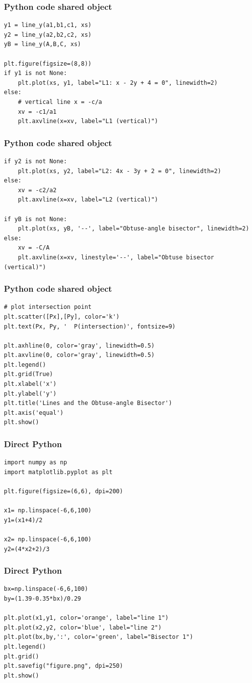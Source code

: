 \documentclass{beamer}
\begin{document}
\begin{frame}[fragile]
\frametitle{Python code shared object}
\begin{lstlisting}
y1 = line_y(a1,b1,c1, xs)
y2 = line_y(a2,b2,c2, xs)
yB = line_y(A,B,C, xs)

plt.figure(figsize=(8,8))
if y1 is not None:
    plt.plot(xs, y1, label="L1: x - 2y + 4 = 0", linewidth=2)
else:
    # vertical line x = -c/a
    xv = -c1/a1
    plt.axvline(x=xv, label="L1 (vertical)")
\end{lstlisting}
\end{frame}
\begin{frame}[fragile]
\frametitle{Python code shared object}
\begin{lstlisting}
if y2 is not None:
    plt.plot(xs, y2, label="L2: 4x - 3y + 2 = 0", linewidth=2)
else:
    xv = -c2/a2
    plt.axvline(x=xv, label="L2 (vertical)")

if yB is not None:
    plt.plot(xs, yB, '--', label="Obtuse-angle bisector", linewidth=2)
else:
    xv = -C/A
    plt.axvline(x=xv, linestyle='--', label="Obtuse bisector (vertical)")
\end{lstlisting}
\end{frame}
\begin{frame}[fragile]
\frametitle{Python code shared object}
\begin{lstlisting}
# plot intersection point
plt.scatter([Px],[Py], color='k')
plt.text(Px, Py, '  P(intersection)', fontsize=9)

plt.axhline(0, color='gray', linewidth=0.5)
plt.axvline(0, color='gray', linewidth=0.5)
plt.legend()
plt.grid(True)
plt.xlabel('x')
plt.ylabel('y')
plt.title('Lines and the Obtuse-angle Bisector')
plt.axis('equal')
plt.show()
\end{lstlisting}
\end{frame}
\begin{frame}[fragile]
\frametitle{Direct Python}
\begin{lstlisting}
import numpy as np
import matplotlib.pyplot as plt

plt.figure(figsize=(6,6), dpi=200)

x1= np.linspace(-6,6,100)
y1=(x1+4)/2

x2= np.linspace(-6,6,100)
y2=(4*x2+2)/3
\end{lstlisting}
\end{frame}
\begin{frame}[fragile]
\frametitle{Direct Python}
\begin{lstlisting}
bx=np.linspace(-6,6,100)
by=(1.39-0.35*bx)/0.29

plt.plot(x1,y1, color='orange', label="line 1")
plt.plot(x2,y2, color='blue', label="line 2")
plt.plot(bx,by,':', color='green', label="Bisector 1")
plt.legend()
plt.grid()
plt.savefig("figure.png", dpi=250)
plt.show()

\end{lstlisting}
\end{frame}
\end{document}

